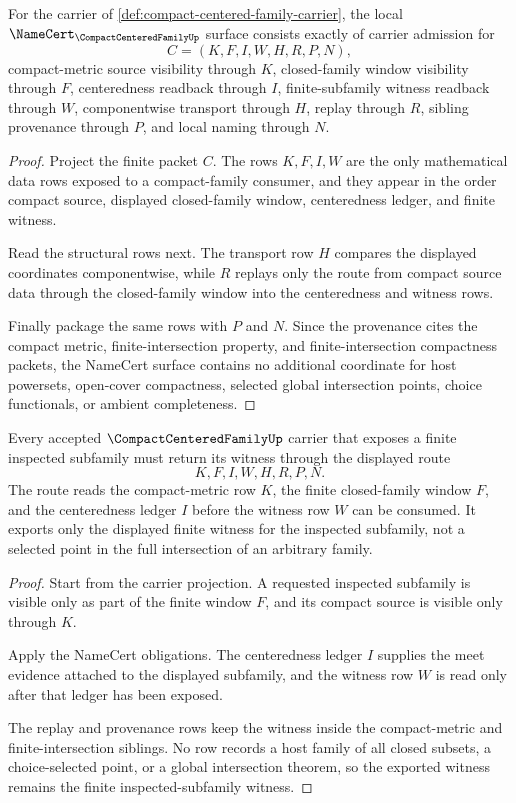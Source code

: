 \begin{theorem}
\label{thm:compact-centered-family-namecert-obligations}
For the carrier of \autoref{def:compact-centered-family-carrier}, the local $\NameCert_{\CompactCenteredFamilyUp}$ surface consists exactly of carrier admission for
$$
C=(K,F,I,W,H,R,P,N),
$$
compact-metric source visibility through $K$, closed-family window visibility through $F$, centeredness readback through $I$, finite-subfamily witness readback through $W$, componentwise transport through $H$, replay through $R$, sibling provenance through $P$, and local naming through $N$.
\end{theorem}
\begin{proof}
Project the finite packet $C$. The rows $K,F,I,W$ are the only mathematical data rows exposed to a compact-family consumer, and they appear in the order compact source, displayed closed-family window, centeredness ledger, and finite witness.

Read the structural rows next. The transport row $H$ compares the displayed coordinates componentwise, while $R$ replays only the route from compact source data through the closed-family window into the centeredness and witness rows.

Finally package the same rows with $P$ and $N$. Since the provenance cites the compact metric, finite-intersection property, and finite-intersection compactness packets, the NameCert surface contains no additional coordinate for host powersets, open-cover compactness, selected global intersection points, choice functionals, or ambient completeness.
\end{proof}

\begin{theorem}
\label{thm:compact-centered-family-finite-subfamily-witness}
Every accepted $\CompactCenteredFamilyUp$ carrier that exposes a finite inspected subfamily must return its witness through the displayed route
$$
K,F,I,W,H,R,P,N.
$$
The route reads the compact-metric row $K$, the finite closed-family window $F$, and the centeredness ledger $I$ before the witness row $W$ can be consumed. It exports only the displayed finite witness for the inspected subfamily, not a selected point in the full intersection of an arbitrary family.
\end{theorem}
\begin{proof}
Start from the carrier projection. A requested inspected subfamily is visible only as part of the finite window $F$, and its compact source is visible only through $K$.

Apply the NameCert obligations. The centeredness ledger $I$ supplies the meet evidence attached to the displayed subfamily, and the witness row $W$ is read only after that ledger has been exposed.

The replay and provenance rows keep the witness inside the compact-metric and finite-intersection siblings. No row records a host family of all closed subsets, a choice-selected point, or a global intersection theorem, so the exported witness remains the finite inspected-subfamily witness.
\end{proof}

